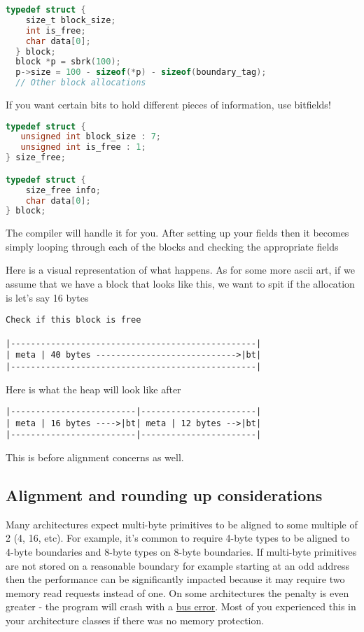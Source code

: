 \begin{lstlisting}[language=C]
  typedef struct {
    size_t block_size;
    int is_free;
    char data[0];
  } block;
  block *p = sbrk(100);
  p->size = 100 - sizeof(*p) - sizeof(boundary_tag);
  // Other block allocations
\end{lstlisting}

If you want certain bits to hold different pieces of information, use bitfields!

\begin{lstlisting}[language=C]
typedef struct {
   unsigned int block_size : 7;
   unsigned int is_free : 1;
} size_free;

typedef struct {
    size_free info;
    char data[0];
} block;
\end{lstlisting}

The compiler will handle it for you.
After setting up your fields then it becomes simply looping through each of the blocks and checking the appropriate fields

Here is a visual representation of what happens.
As for some more ascii art, if we assume that we have a block that looks like this, we want to spit if the allocation is let's say 16 bytes
\begin{verbatim}
Check if this block is free

|-------------------------------------------------|
| meta | 40 bytes ---------------------------->|bt|
|-------------------------------------------------|
\end{verbatim}

Here is what the heap will look like after

\begin{verbatim}
|-------------------------|-----------------------|
| meta | 16 bytes ---->|bt| meta | 12 bytes -->|bt|
|-------------------------|-----------------------|
\end{verbatim}

This is before alignment concerns as well.

\subsection{Alignment and rounding up considerations}

Many architectures expect multi-byte primitives to be aligned to some multiple of 2 (4, 16, etc).
For example, it's common to require 4-byte types to be aligned to 4-byte boundaries and 8-byte types on 8-byte boundaries.
If multi-byte primitives are not stored on a reasonable boundary for example starting at an odd address then the performance can be significantly impacted because it may require two memory read requests instead of one.
On some architectures the penalty is even greater - the program will crash with a \href{http://en.wikipedia.org/wiki/Bus_error\#Unaligned_access}{bus error}.
Most of you experienced this in your architecture classes if there was no memory protection.

